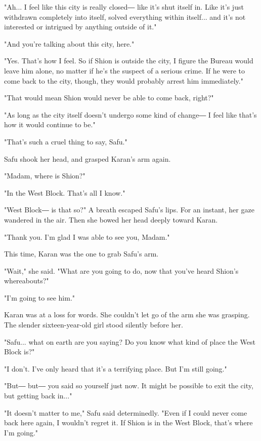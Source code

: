"Ah... I feel like this city is really closed― like it's shut itself in.
Like it's just withdrawn completely into itself, solved everything
within itself... and it's not interested or intrigued by anything
outside of it."

"And you're talking about this city, here."

"Yes. That's how I feel. So if Shion is outside the city, I figure the
Bureau would leave him alone, no matter if he's the suspect of a serious
crime. If he were to come back to the city, though, they would probably
arrest him immediately."

"That would mean Shion would never be able to come back, right?"

"As long as the city itself doesn't undergo some kind of change― I feel
like that's how it would continue to be."

"That's such a cruel thing to say, Safu."

Safu shook her head, and grasped Karan's arm again.

"Madam, where is Shion?"

"In the West Block. That's all I know."

"West Block― is that so?" A breath escaped Safu's lips. For an instant,
her gaze wandered in the air. Then she bowed her head deeply toward
Karan.

"Thank you. I'm glad I was able to see you, Madam."

This time, Karan was the one to grab Safu's arm.

"Wait," she said. "What are you going to do, now that you've heard
Shion's whereabouts?"

"I'm going to see him."

\mybreak

Karan was at a loss for words. She couldn't let go of the arm she was
grasping. The slender sixteen-year-old girl stood silently before her.

"Safu... what on earth are you saying? Do you know what kind of place
the West Block is?"

"I don't. I've only heard that it's a terrifying place. But I'm still
going."

"But― but― you said so yourself just now. It might be possible to exit
the city, but getting back in..."

"It doesn't matter to me," Safu said determinedly. "Even if I could
never come back here again, I wouldn't regret it. If Shion is in the
West Block, that's where I'm going."


